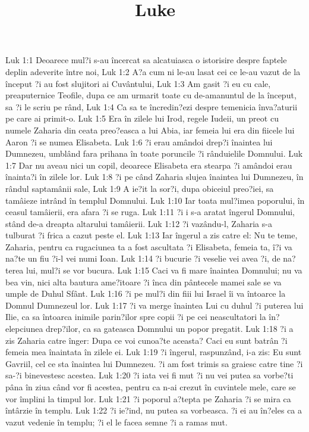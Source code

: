 

\title{Luke}

Luk 1:1  Deoarece mul?i s-au încercat sa alcatuiasca o istorisire despre faptele deplin adeverite între noi,
Luk 1:2  A?a cum ni le-au lasat cei ce le-au vazut de la început ?i au fost slujitori ai Cuvântului,
Luk 1:3  Am gasit ?i eu cu cale, preaputernice Teofile, dupa ce am urmarit toate cu de-amanuntul de la început, sa ?i le scriu pe rând,
Luk 1:4  Ca sa te încredin?ezi despre temenicia înva?aturii pe care ai primit-o.
Luk 1:5  Era în zilele lui Irod, regele Iudeii, un preot cu numele Zaharia din ceata preo?easca a lui Abia, iar femeia lui era din fiicele lui Aaron ?i se numea Elisabeta.
Luk 1:6  ?i erau amândoi drep?i înaintea lui Dumnezeu, umblând fara prihana în toate poruncile ?i rânduielile Domnului.
Luk 1:7  Dar nu aveau nici un copil, deoarece Elisabeta era stearpa ?i amândoi erau înainta?i în zilele lor.
Luk 1:8  ?i pe când Zaharia slujea înaintea lui Dumnezeu, în rândul saptamânii sale,
Luk 1:9  A ie?it la sor?i, dupa obiceiul preo?iei, sa tamâieze intrând în templul Domnului.
Luk 1:10  Iar toata mul?imea poporului, în ceasul tamâierii, era afara ?i se ruga.
Luk 1:11  ?i i s-a aratat îngerul Domnului, stând de-a dreapta altarului tamâierii.
Luk 1:12  ?i vazându-l, Zaharia s-a tulburat ?i frica a cazut peste el.
Luk 1:13  Iar îngerul a zis catre el: Nu te teme, Zaharia, pentru ca rugaciunea ta a fost ascultata ?i Elisabeta, femeia ta, î?i va na?te un fiu ?i-l vei numi Ioan.
Luk 1:14  ?i bucurie ?i veselie vei avea ?i, de na?terea lui, mul?i se vor bucura.
Luk 1:15  Caci va fi mare înaintea Domnului; nu va bea vin, nici alta bautura ame?itoare ?i înca din pântecele mamei sale se va umple de Duhul Sfânt.
Luk 1:16  ?i pe mul?i din fiii lui Israel îi va întoarce la Domnul Dumnezeul lor.
Luk 1:17  ?i va merge înaintea Lui cu duhul ?i puterea lui Ilie, ca sa întoarca inimile parin?ilor spre copii ?i pe cei neascultatori la în?elepciunea drep?ilor, ca sa gateasca Domnului un popor pregatit.
Luk 1:18  ?i a zis Zaharia catre înger: Dupa ce voi cunoa?te aceasta? Caci eu sunt batrân ?i femeia mea înaintata în zilele ei.
Luk 1:19  ?i îngerul, raspunzând, i-a zis: Eu sunt Gavriil, cel ce sta înaintea lui Dumnezeu. ?i am fost trimis sa graiesc catre tine ?i sa-?i binevestesc acestea.
Luk 1:20  ?i iata vei fi mut ?i nu vei putea sa vorbe?ti pâna în ziua când vor fi acestea, pentru ca n-ai crezut în cuvintele mele, care se vor împlini la timpul lor.
Luk 1:21  ?i poporul a?tepta pe Zaharia ?i se mira ca întârzie în templu.
Luk 1:22  ?i ie?ind, nu putea sa vorbeasca. ?i ei au în?eles ca a vazut vedenie în templu; ?i el le facea semne ?i a ramas mut.
